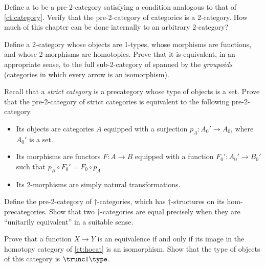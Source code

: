 \begin{ex}\label{ct:2cat}
  Define a 
  to be a pre-2-category satisfying a condition analogous to that of \cref{ct:category}.
  Verify that the pre-2-category of categories \ucat is a 2-category.
  How much of this chapter can be done internally to an arbitrary 2-category?
\end{ex}

\begin{ex}\label{ct:groupoids}
  Define a 2-category whose objects are 1-types, whose morphisms are functions, and whose 2-morphisms are homotopies.
  Prove that it is equivalent, in an appropriate sense, to the full sub-2-category of \ucat spanned by the \emph{groupoids} (categories in which every arrow is an isomorphism).
\end{ex}

\begin{ex}\label{ex:2strict-cat}
  Recall that a \emph{strict category} is a precategory whose type of objects is a set.
  Prove that the pre-2-category of strict categories is equivalent to the following pre-2-category.
  \begin{itemize}
  \item Its objects are categories $A$ equipped with a surjection
    $p_A:A_0'\to A_0$, where $A_0'$ is a set.
  \item Its morphisms are functors $F:A\to B$ equipped with a function $F_0':A_0' \to B_0'$ such that $p_B \circ F_0' = F_0 \circ p_A$.
  \item Its 2-morphisms are simply natural transformations.
  \end{itemize}
\end{ex}

\begin{ex}\label{ex:pre2dagger-cat}
  Define the pre-2-category of $\dagger$-categories, which has $\dagger$-struc\-tures on its hom-pre\-cat\-egories.
  Show that two $\dagger$-categories are equal precisely when they are ``unitarily equivalent'' in a suitable sense.
\end{ex}

\begin{ex}\label{ct:ex:hocat}
  Prove that a function $X\to Y$ is an equivalence if and only if its image in the homotopy category of \cref{ct:hocat} is an isomorphism.
  Show that the type of objects of this category is $\trunc1\type$.
\end{ex}

